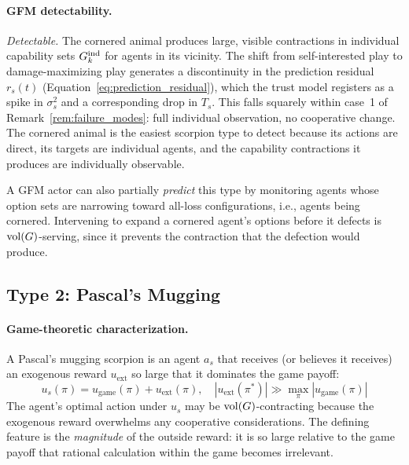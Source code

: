 \paragraph{GFM detectability.} \emph{Detectable.} The cornered animal produces
large, visible contractions in individual capability sets $G_{k}^{\mathrm{ind}}$ for agents
in its vicinity. The shift from self-interested play to damage-maximizing play
generates a discontinuity in the prediction residual $r_s(t)$
(Equation~\ref{eq:prediction_residual}), which the trust model registers as a
spike in $\sigma_s^2$ and a corresponding drop in $T_s$. This falls squarely
within case~1 of Remark~\ref{rem:failure_modes}: full individual observation,
no cooperative change. The cornered animal is the easiest scorpion type to
detect because its actions are direct, its targets are individual agents, and
the capability contractions it produces are individually observable.

A GFM actor can also partially \emph{predict} this type by monitoring agents
whose option sets are narrowing toward all-loss configurations, i.e., agents
being cornered. Intervening to expand a cornered agent's options before it
defects is $\operatorname{vol}(G)$-serving, since it prevents the contraction that the
defection would produce.


\subsection{Type 2: Pascal's Mugging}
\label{app:pascals_mugging}

\paragraph{Game-theoretic characterization.} A Pascal's mugging scorpion is an
agent $a_s$ that receives (or believes it receives) an exogenous reward
$u_{\mathrm{ext}}$ so large that it dominates the game payoff:
\begin{equation}
\label{eq:pascals_mugging}
u_s(\pi) = u_{\mathrm{game}}(\pi) + u_{\mathrm{ext}}(\pi), \quad |u_{\mathrm{ext}}(\pi^*)| \gg \max_\pi |u_{\mathrm{game}}(\pi)|
\end{equation}
The agent's optimal action under $u_s$ may be $\operatorname{vol}(G)$-contracting because
the exogenous reward overwhelms any cooperative considerations. The defining
feature is the \emph{magnitude} of the outside reward: it is so large relative
to the game payoff that rational calculation within the game becomes
irrelevant.

